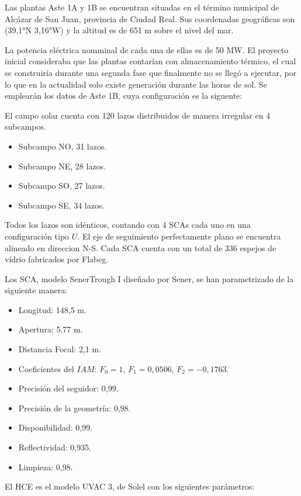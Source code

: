Las plantas Aste 1A y 1B se encuentran situadas en el término municipal
de Alcázar de San Juan, provincia de Ciudad Real. Sus coordenadas
geográficas son (39,1°N 3,16°W) y la altitud es de 651 m sobre el nivel
del mar.

La potencia eléctrica nomminal de cada una de ellas es de 50 MW. El
proyecto inicial consideraba que las plantas contarían con
almacenamiento térmico, el cual se construiría durante una segunda fase
que finalmente no se llegó a ejecutar, por lo que en la actualidad solo
existe generación durante las horas de sol. Se emplearán los datos de
Aste 1B, cuya configuración es la siguente:

El campo solar cuenta con 120 lazos distribuidos de manera irregular en
4 subcampos.

\begin{itemize}
\tightlist
\item
  Subcampo NO, 31 lazos.
\item
  Subcampo NE, 28 lazos.
\item
  Subcampo SO, 27 lazos.
\item
  Subcampo SE, 34 lazos.
\end{itemize}

Todos los lazos son idénticos, contando con 4 SCAs cada uno en una
configuración tipo \(U\). El eje de seguimiento perfectamente plano se
encuentra alineado en direccion N-S. Cada SCA cuenta con un total de 336
espejos de vídrio fabricados por Flabeg.

Los SCA, modelo SenerTrough I diseñado por Sener, se han parametrizado
de la siguiente manera:

\begin{itemize}
\tightlist
\item
  Longitud: 148,5 m.
\item
  Apertura: 5,77 m.
\item
  Distancia Focal: 2,1 m.
\item
  Coeficientes del \(IAM\): \(F_{0}=1\), \(F_{1}=0,0506\),
  \(F_{2}=-0,1763\).
\item
  Precisión del seguidor: 0,99.
\item
  Precisión de la geometría: 0,98.
\item
  Disponibilidad: 0,99.
\item
  Reflectividad: 0,935.
\item
  Limpieza: 0,98.
\end{itemize}

El HCE es el modelo UVAC 3, de Solel con los siguientes parámetros:

